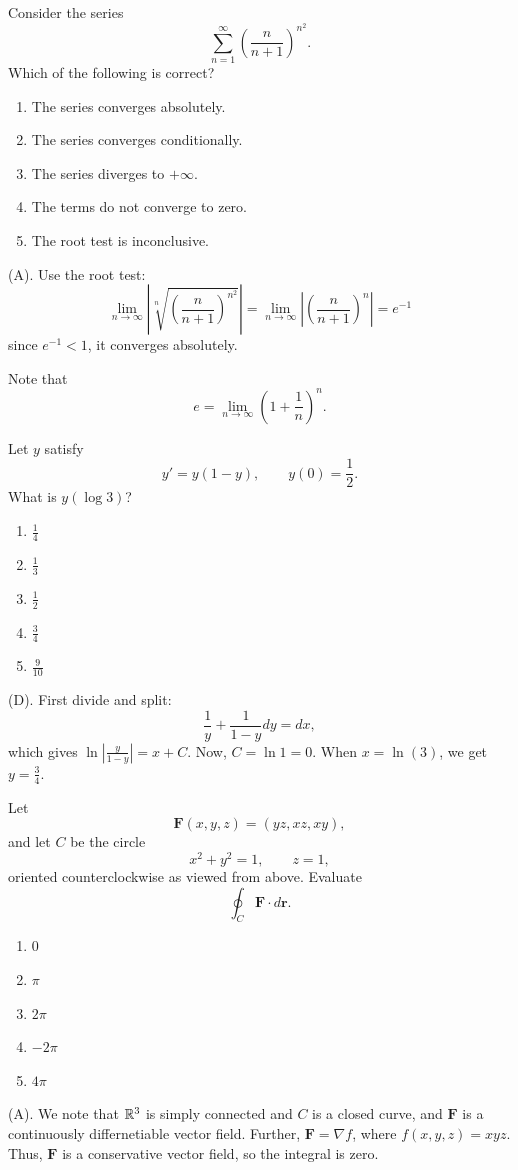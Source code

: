 \begin{exercise}
Consider the series
\[
\sum_{n=1}^{\infty}
\left(\frac{n}{n+1}\right)^{n^2}.
\]
Which of the following is correct?
\begin{enumerate}[label=(\Alph*)]
\item The series converges absolutely.
\item The series converges conditionally.
\item The series diverges to $+\infty$.
\item The terms do not converge to zero.
\item The root test is inconclusive.
\end{enumerate}
\end{exercise}
\begin{solution}
(A). Use the root test: 
\[
\lim_{n \rightarrow \infty} \left|\sqrt[n]{\left(\frac{n}{n + 1}\right)^{n^2}} \right|
= \lim_{n \rightarrow \infty} \left|\left(\frac{n}{n + 1}\right)^n\right|
= e^{-1}
\]
since $e^{-1} < 1$, it converges absolutely.
\end{solution}
\begin{remark}
Note that 
\[
e = \lim_{n \rightarrow \infty} \left(1 + \frac{1}{n}\right)^n.
\]
\end{remark}

\begin{exercise}
Let $y$ satisfy
\[
y'=y(1-y),
\qquad y(0)=\frac12.
\]
What is $y(\log3)$?
\begin{enumerate}[label=(\Alph*)]
\item $\frac14$
\item $\frac13$
\item $\frac12$
\item $\frac34$
\item $\frac9{10}$
\end{enumerate}
\end{exercise}
\begin{solution}
(D). First divide and split:
\[
\frac{1}{y} + \frac{1}{1 - y} dy = dx,
\]
which gives $\ln|\frac{y}{1-y}| = x + C$.
Now, $C = \ln 1 = 0$. When $x = \ln(3)$, we get $y = \frac{3}{4}$.
\end{solution}

\begin{exercise}
Let
\[
\mathbf F(x,y,z)=(yz,xz,xy),
\]
and let $C$ be the circle
\[
x^2+y^2=1,\qquad z=1,
\]
oriented counterclockwise as viewed from above. Evaluate
\[
\oint_C\mathbf F\cdot d\mathbf r.
\]
\begin{enumerate}[label=(\Alph*)]
\item $0$
\item $\pi$
\item $2\pi$
\item $-2\pi$
\item $4\pi$
\end{enumerate}
\end{exercise}
\begin{solution}
(A). We note that $\mathbb{R}^3$ is simply connected and $C$ is a closed curve, and
$\mathbf{F}$ is a continuously differnetiable vector field. Further,
$\mathbf{F} = \nabla f$, where $f(x,y,z) = xyz$. Thus, $\mathbf{F}$ is a conservative 
vector field, so the integral is zero.
\end{solution}

